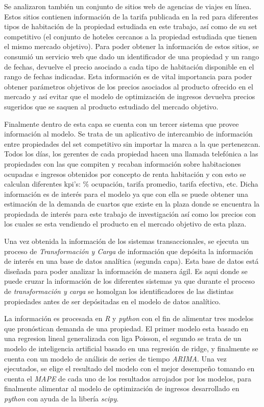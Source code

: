 Se analizaron también un conjunto de sitios web de agencias de viajes en línea. Estos sitios contienen información de la tarifa publicada en la red para diferentes tipos de habitación de la propiedad estudiada en este trabajo, así como de su set competitivo (el conjunto de hoteles cercanos a la propiedad estudiada que tienen el mismo mercado objetivo). Para poder obtener la información de estos sitios, se consumió un servicio web que dado un identificador de una propiedad y un rango de fechas, devuelve el precio asociado a cada tipo de habitación disponible en el rango de fechas indicadas. Esta información es de vital importancia para poder obtener parámetros objetivos de los precios asociados al producto ofrecido en el mercado y así evitar que el modelo de optimización de ingresos devuelva precios sugeridos que se saquen al producto estudiado del mercado objetivo.

Finalmente dentro de esta capa se cuenta con un tercer sistema que provee información al modelo. Se trata de un aplicativo de intercambio de información entre propiedades del set competitivo sin importar la marca a la que pertenezcan. Todos los días, los gerentes de cada propiedad hacen una llamada telefónica a las propiedades con las que compiten y recaban información sobre habitaciones ocupadas e ingresos obtenidos por concepto de renta habitación y con esto se calculan diferentes kpi's: \% ocupación, tarifa promedio, tarifa efectiva, etc. Dicha información es de interés para el modelo ya que con ella se puede obtener una estimación de la demanda de cuartos que existe en la plaza donde se encuentra la propiedada de interés para este trabajo de investigación así como los precios con los cuales se esta vendiendo el producto en el mercado objetivo de esta plaza.

Una vez obtenida la información de los sistemas transaccionales, se ejecuta un proceso de \emph{Transformación y Carga} de información que depósita la información de interés en una base de datos analítica (segunda capa). Esta base de datos está diseñada para poder analizar la información de manera ágil. Es aqui donde se puede cruzar la información de los diferentes sistemas ya que durante el proceso de \emph{transformación y carga} se homolgan los identificadores de las distintas propiedades antes de ser depósitadas en el modelo de datos analítico.

La información es procesada en \emph{R} y \emph{python} con el fin de alimentar tres modelos que pronóstican demanda de una propiedad. El primer modelo esta basado en una regresion lineal generalizada con liga Poisson, el segundo se trata de un modelo de inteligencia artificial basado en una regresión de ridge, y finalmente se cuenta con un modelo de análisis de series de tiempo \emph{ARIMA}. Una vez ejecutados, se elige el resultado del modelo con el mejor desempeño tomando en cuenta el \emph{MAPE} de cada uno de los resultados arrojados por los modelos, para finalmente alimentar al modelo de optimización de ingresos desarrollado en \emph{python} con ayuda de la libería \emph{scipy}.

